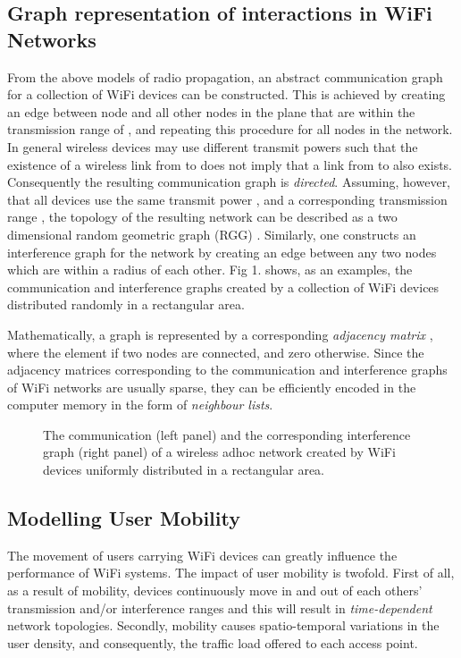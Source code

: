 \documentclass{elsart}
\begin{document}
\subsection{Graph representation of interactions in WiFi Networks}
From the above models of radio propagation, an abstract 
communication graph  for a collection of WiFi devices can be constructed.
This is achieved by creating an edge between node  and all other 
nodes in the plane that are  within the transmission range of , 
and repeating this procedure for all nodes in the network.
In general wireless devices may use different transmit powers 
such that the existence of a wireless link from  to  does not imply 
that a link from  to  also exists. Consequently the resulting 
communication graph is {\it directed}. 
Assuming, however, that all devices use the same transmit power , 
and a corresponding transmission range ,
the topology of the resulting network can be described as a 
two dimensional random geometric graph (RGG) \cite{rgg1}.
Similarly, one constructs an interference graph for the network by 
creating an edge between any two nodes which are within a radius  of each other. Fig 1. shows, as an examples, the communication and 
interference graphs created by a collection of WiFi devices distributed 
randomly in a   rectangular 
area.

Mathematically, a graph is represented by a corresponding  
{\it adjacency matrix} , where the element  if two nodes are connected, and zero otherwise. Since the adjacency matrices corresponding to the communication and interference graphs 
of WiFi networks are usually  
sparse, they can be efficiently encoded in the computer memory in 
the form of {\it neighbour lists}.

\begin{figure}[t]

 \caption{The communication (left panel) and the corresponding
 interference graph (right panel) of a wireless adhoc network created
 by WiFi devices uniformly distributed in a   
rectangular area.}
\end{figure}

\subsection{ Modelling User Mobility}
The movement of users carrying  WiFi devices 
can greatly influence the performance of WiFi systems.
The impact of user mobility is twofold. First of all, as a result of mobility,
devices  continuously move in and out of each others' transmission and/or
interference ranges and this will  result in {\it time-dependent} network topologies. Secondly, mobility causes spatio-temporal variations in the user density, 
and consequently, the traffic load offered to each access point.
\end{document}
